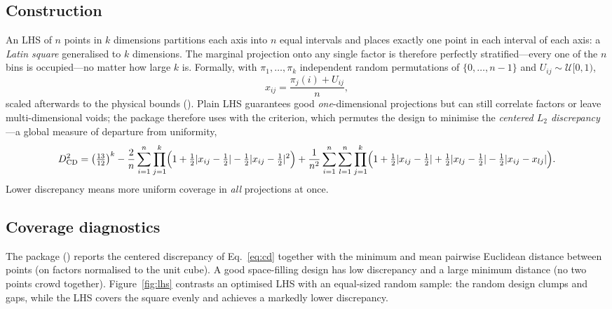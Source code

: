 \subsection{Construction}

An LHS of $n$ points in $k$ dimensions partitions each axis into $n$ equal
intervals and places exactly one point in each interval of each axis: a
\emph{Latin square} generalised to $k$ dimensions. The marginal projection onto
any single factor is therefore perfectly stratified---every one of the $n$ bins
is occupied---no matter how large $k$ is. Formally, with $\pi_1,\dots,\pi_k$
independent random permutations of $\{0,\dots,n-1\}$ and $U_{ij}\sim\mathcal
U[0,1)$,
%
\begin{equation}
x_{ij} = \frac{\pi_j(i) + U_{ij}}{n},
\end{equation}
%
scaled afterwards to the physical bounds (). Plain LHS guarantees
good \emph{one}-dimensional projections but can still correlate factors or leave
multi-dimensional voids; the package therefore uses
 with the  criterion,
which permutes the design to minimise the \emph{centered $L_2$ discrepancy}---a
global measure of departure from uniformity,
%
\begin{equation}
D_{\mathrm{CD}}^2 =
\left(\tfrac{13}{12}\right)^{k}
- \frac{2}{n}\sum_{i=1}^{n}\prod_{j=1}^{k}
  \Bigl(1 + \tfrac12|x_{ij}-\tfrac12| - \tfrac12|x_{ij}-\tfrac12|^2\Bigr)
+ \frac{1}{n^2}\sum_{i=1}^{n}\sum_{l=1}^{n}\prod_{j=1}^{k}
  \Bigl(1 + \tfrac12|x_{ij}-\tfrac12| + \tfrac12|x_{lj}-\tfrac12|
        - \tfrac12|x_{ij}-x_{lj}|\Bigr).
\label{eq:cd}
\end{equation}
%
Lower discrepancy means more uniform coverage in \emph{all} projections at once.

\subsection{Coverage diagnostics}

The package () reports the centered discrepancy of
Eq.~\eqref{eq:cd} together with the minimum and mean pairwise Euclidean distance
between points (on factors normalised to the unit cube). A good space-filling
design has low discrepancy and a large minimum distance (no two points crowd
together). Figure~\ref{fig:lhs} contrasts an optimised LHS with an
equal-sized random sample: the random design clumps and gaps, while the LHS
covers the square evenly and achieves a markedly lower discrepancy.

